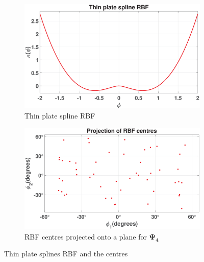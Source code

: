 \begin{figure}[ht]
\centering
\begin{subfigure}[t]{1\textwidth}
    \centering
    \includegraphics[width=0.75\linewidth]{figures/thinplate}
    \caption{Thin plate spline RBF}
    \label{fig: RBF_centres}
\end{subfigure}
\begin{subfigure}[t]{0.75\textwidth}
    \centering
    \includegraphics[width=1\linewidth]{figures/RBF_centres}
    \caption{RBF centres projected onto a plane for $\mathbf{\Psi_4}$ }
    \label{fig: thinplate}
\end{subfigure}
\caption{Thin plate splines RBF and the centres}
\end{figure}


